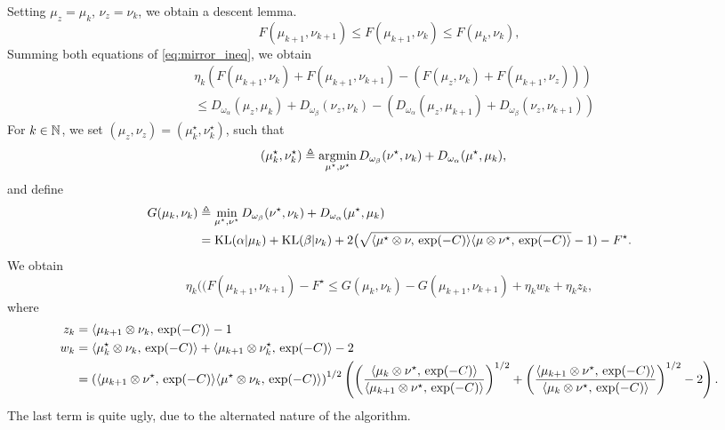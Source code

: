 \documentclass[a4paper, 10pt]{article}
\begin{document}
Setting $\mu_z = \mu_{k}$, $\nu_z = \nu_k$, we obtain a descent lemma.
\begin{equation}
    F(\mu_{k+1}, \nu_{k+1}) \leq F(\mu_{k+1}, \nu_{k}) \leq F(\mu_{k}, \nu_{k}),
\end{equation}
Summing both equations of \eqref{eq:mirror_ineq}, we obtain
\begin{align}
    &\eta_k (F(\mu_{k+1},\nu_k) + F(\mu_{k+1},\nu_{k+1})
    - (F(\mu_z, \nu_k) + F(\mu_{k+1}, \nu_z))) \\ 
    &\leq 
    D_{\omega_\alpha}(\mu_z, \mu_k)
    + D_{\omega_\beta}(\nu_z, \nu_k)
    - (D_{\omega_\alpha}(\mu_z, \mu_{k+1}) 
     + D_{\omega_\beta}(\nu_z, \nu_{k+1}))
\end{align}
For $k \in \mathbb{N}$, we set $(\mu_z, \nu_z) = (\mu^\star_k, \nu^\star_k)$, such that
\begin{align}
    (\mu^\star_k, \nu^\star_k) &\triangleq \operatorname*{argmin}_{\mu^\star, \nu^\star} D_{\omega_\beta}
    (\nu^\star, \nu_k) + D_{\omega_\alpha}(\mu^\star, \mu_k),
\end{align}
and define
\begin{align}
    G(\mu_k, \nu_k) &\triangleq \min_{\mu^\star, \nu^\star} 
    D_{\omega_\beta}
    (\nu^\star, \nu_k) + D_{\omega_\alpha}(\mu^\star, \mu_k) \\
    &= \text{KL}(\alpha|\mu_k) + \text{KL}(\beta|\nu_k) 
    + 2 \big( \sqrt{\langle \mu^\star \otimes \nu,\,\exp(-C)\rangle 
    \langle \mu \otimes \nu^\star,\,\exp(-C)\rangle} - 1) - F^\star. \\
\end{align}
We obtain
\begin{equation}
    \eta_k (
        (F(\mu_{k+1}, \nu_{k+1}) - F^\star
        \leq G(\mu_k, \nu_{k}) - G(\mu_{k+1}, \nu_{k+1}) + \eta_k w_k + \eta_k z_k,
\end{equation}
where
\begin{align}
    z_k &= \langle \mu_{k+1} \otimes \nu_k,\,\exp(-C)\rangle - 1 \\
    w_k &= \langle \mu_k^\star \otimes \nu_k,\,\exp(-C)\rangle
    + \langle \mu_{k+1} \otimes \nu_k^\star,\,\exp(-C)\rangle - 2\\
    &=\left(
    \langle \mu_{k+1} \otimes \nu^\star,\,\exp(-C)\rangle
    \langle \mu^\star \otimes \nu_k,\,\exp(-C)\rangle
    \right)^{1/2}
    \left(
        \left(\frac{
            \langle \mu_k \otimes \nu^\star,\,\exp(-C)\rangle
        }
        {
            \langle \mu_{k+1} \otimes \nu^\star,\,\exp(-C)\rangle
        }\right)^{1/2}
        + 
        \left(\frac{
            \langle \mu_{k+1} \otimes \nu^\star,\,\exp(-C)\rangle
        }
        {
            \langle \mu_k \otimes \nu^\star,\,\exp(-C)\rangle
        }
        \right)^{1/2} - 2
    \right).
\end{align}
The last term is quite ugly, due to the alternated nature of the algorithm.

\printbibliography
\end{document}
